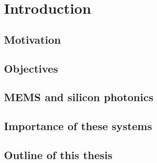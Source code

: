\documentclass[../main.tex]{subfiles}
\begin{document}
	
	
\chapter{Introduction}

	\section{Motivation}

	\section{Objectives}

	\section{MEMS and silicon photonics}

	\section{Importance of these systems}
	
	\section{Outline of this thesis}
	
\end{document}
